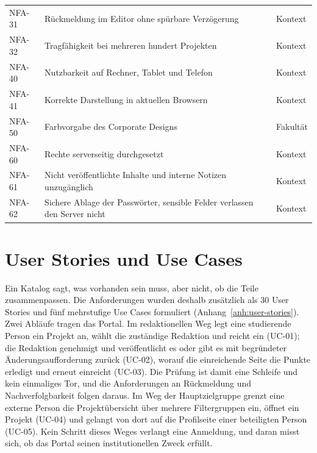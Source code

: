 \begin{longtable}{@{}L{1.4cm}L{9.6cm}L{3.5cm}@{}}
	NFA-31 & Rückmeldung im Editor ohne spürbare Verzögerung & Kontext \\
	NFA-32 & Tragfähigkeit bei mehreren hundert Projekten & Kontext \\
	NFA-40 & Nutzbarkeit auf Rechner, Tablet und Telefon & Kontext \\
	NFA-41 & Korrekte Darstellung in aktuellen Browsern & Kontext \\
	NFA-50 & Farbvorgabe des Corporate Designs & Fakultät \\
	NFA-60 & Rechte serverseitig durchgesetzt & Kontext \\
	NFA-61 & Nicht veröffentlichte Inhalte und interne Notizen unzugänglich & Kontext \\
	NFA-62 & Sichere Ablage der Passwörter, sensible Felder verlassen den Server nicht & Kontext \\
\end{longtable}
\endgroup

\section{User Stories und Use Cases}
\label{sec:user-stories}

Ein Katalog sagt, was vorhanden sein muss, aber nicht, ob die Teile zusammenpassen. Die Anforderungen wurden deshalb zusätzlich als 30 User Stories und fünf mehrstufige Use Cases formuliert (Anhang~\ref{anh:user-stories}). Zwei Abläufe tragen das Portal. Im redaktionellen Weg legt eine studierende Person ein Projekt an, wählt die zuständige Redaktion und reicht ein (UC-01); die Redaktion genehmigt und veröffentlicht es oder gibt es mit begründeter Änderungsaufforderung zurück (UC-02), worauf die einreichende Seite die Punkte erledigt und erneut einreicht (UC-03). Die Prüfung ist damit eine Schleife und kein einmaliges Tor, und die Anforderungen an Rückmeldung und Nachverfolgbarkeit folgen daraus. Im Weg der Hauptzielgruppe grenzt eine externe Person die Projektübersicht über mehrere Filtergruppen ein, öffnet ein Projekt (UC-04) und gelangt von dort auf die Profilseite einer beteiligten Person (UC-05). Kein Schritt dieses Weges verlangt eine Anmeldung, und daran misst sich, ob das Portal seinen institutionellen Zweck erfüllt.
